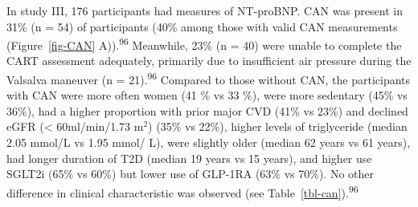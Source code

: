 \documentclass[
  a4paper,
  headsepline=true,
  open=left]{scrbook}
\begin{document}
In study III, 176 participants had measures of NT-proBNP. CAN was
present in 31\% (n = 54) of participants (40\% among those with valid
CAN measurements (Figure~\ref{fig-CAN} A)).\textsuperscript{96}
Meanwhile, 23\% (n = 40) were unable to complete the CART assessment
adequately, primarily due to insufficient air pressure during the
Valsalva maneuver (n = 21).\textsuperscript{96} Compared to those
without CAN, the participants with CAN were more often women (41 \% vs
33 \%), were more sedentary (45\% vs 36\%), had a higher proportion with
prior major CVD (41\% vs 23\%) and declined eGFR (\textless{}
60ml/min/1.73 m\(^2\)) (35\% vs 22\%), higher levels of triglyceride
(median 2.05 mmol/L vs 1.95 mmol/ L), were slightly older (median 62
years vs 61 years), had longer duration of T2D (median 19 years vs 15
years), and higher use SGLT2i (65\% vs 60\%) but lower use of GLP-1RA
(63\% vs 70\%). No other difference in clinical characteristic was
observed (see Table~\ref{tbl-can}).\textsuperscript{96}

\end{document}
